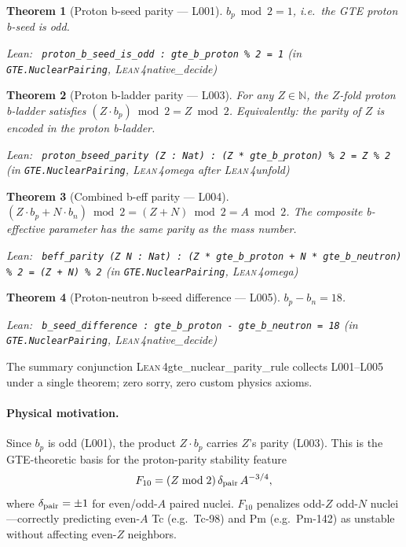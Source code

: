 \documentclass[11pt,a4paper]{article}
\newenvironment{leanref}%
  {\par\smallskip\noindent\begingroup\raggedright\textup{Lean:}~}%
  {\par\endgroup}
\newtheorem{theorem}{Theorem}[section]
\theoremstyle{definition}
\newcommand{\lean}{\textsc{Lean}\,4}
\begin{document}
\begin{theorem}[Proton b-seed parity — L001]\label{thm:proton-b-odd}
$b_p \bmod 2 = 1$, i.e.\ the GTE proton b-seed is odd.
\begin{leanref}
\lstinline|proton_b_seed_is_odd : gte_b_proton % 2 = 1|
\textup{(in \texttt{GTE.NuclearPairing}, \lean{native\_decide})}
\end{leanref}
\end{theorem}

\begin{theorem}[Proton b-ladder parity — L003]\label{thm:proton-bseed-parity}
For any $Z\in\mathbb{N}$, the $Z$-fold proton b-ladder satisfies
$(Z \cdot b_p) \bmod 2 = Z \bmod 2$.
Equivalently: \emph{the parity of $Z$ is encoded in the proton b-ladder}.
\begin{leanref}
\lstinline|proton_bseed_parity (Z : Nat) : (Z * gte_b_proton) % 2 = Z % 2|
\textup{(in \texttt{GTE.NuclearPairing}, \lean{omega} after \lean{unfold})}
\end{leanref}
\end{theorem}

\begin{theorem}[Combined b-eff parity — L004]\label{thm:beff-parity}
$(Z \cdot b_p + N \cdot b_n) \bmod 2 = (Z + N) \bmod 2 = A \bmod 2$.
The composite b-effective parameter has the same parity as the mass number.
\begin{leanref}
\lstinline|beff_parity (Z N : Nat) : (Z * gte_b_proton + N * gte_b_neutron) % 2 = (Z + N) % 2|
\textup{(in \texttt{GTE.NuclearPairing}, \lean{omega})}
\end{leanref}
\end{theorem}

\begin{theorem}[Proton-neutron b-seed difference — L005]\label{thm:b-seed-diff}
$b_p - b_n = 18$.
\begin{leanref}
\lstinline|b_seed_difference : gte_b_proton - gte_b_neutron = 18|
\textup{(in \texttt{GTE.NuclearPairing}, \lean{native\_decide})}
\end{leanref}
\end{theorem}

The summary conjunction \lean{gte\_nuclear\_parity\_rule} collects L001--L005 under a single theorem; zero sorry, zero custom physics axioms.

\paragraph{Physical motivation.}
Since $b_p$ is odd (L001), the product $Z \cdot b_p$ carries $Z$'s parity (L003).
This is the GTE-theoretic basis for the proton-parity stability feature
\[
F_{10} = (Z \bmod 2)\,\delta_{\rm pair}\,A^{-3/4},
\]
where $\delta_{\rm pair} = \pm 1$ for even/odd-$A$ paired nuclei.
$F_{10}$ penalizes odd-$Z$ odd-$N$ nuclei---correctly predicting
even-$A$ Tc (e.g.\ Tc-98) and Pm (e.g.\ Pm-142) as unstable
without affecting even-$Z$ neighbors.
\end{document}
